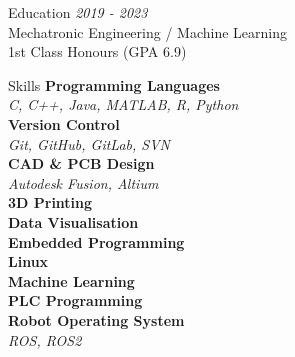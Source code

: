 \documentclass{custom-resume}
\begin{document}
{\begin{minipage}[t][23cm]{0.36\textwidth}
\begin{minipage}[t][23cm]{0.7\textwidth}
\begin{section}{Education}
      \textit{2019 - 2023} \\[8pt]

      Mechatronic Engineering / Machine Learning \\[8pt]

      1st Class Honours (GPA 6.9)

    \end{section}


    \begin{section*}{Skills}
      \textbf{Programming Languages} \\[2pt]
      \textit{C, C++, Java, MATLAB, R, Python} \\[8pt]

      \textbf{Version Control} \\[2pt]
      \textit{Git, GitHub, GitLab, SVN} \\[8pt]

      \textbf{CAD \& PCB Design} \\[2pt]
      \textit{Autodesk Fusion, Altium} \\[8pt]

      \textbf{3D Printing} \\[8pt]

      \textbf{Data Visualisation} \\[8pt]

      \textbf{Embedded Programming} \\[8pt]

      \textbf{Linux} \\[8pt]

      \textbf{Machine Learning} \\[8pt]

      \textbf{PLC Programming} \\[8pt]

      \textbf{Robot Operating System} \\[2pt]
      \textit{ROS, ROS2}
    \end{section*}

  \end{minipage}
\end{minipage}}%
\hspace{0.06\textwidth}%
\end{document}
